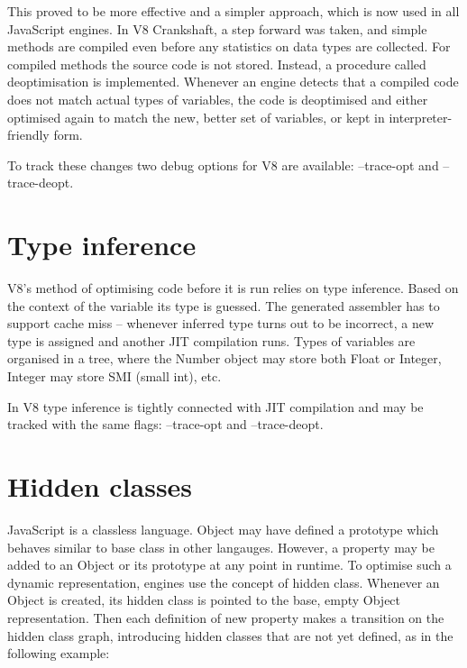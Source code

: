 This proved to be more effective and a simpler approach, which is now used in all JavaScript engines. In V8 Crankshaft, a step forward was taken, and simple methods are compiled even before any statistics on data types are collected. For compiled methods the source code is not stored. Instead, a procedure called deoptimisation is implemented. Whenever an engine detects that a compiled code does not match actual types of variables, the code is deoptimised and either optimised again to match the new, better set of variables, or kept in interpreter-friendly form.

To track these changes two debug options for V8 are available: --trace-opt and --trace-deopt.




\section{Type inference}
\label{sec:typeference}

V8's method of optimising code before it is run relies on type inference. Based on the context of the variable its type is guessed. The generated assembler has to support cache miss -- whenever inferred type turns out to be incorrect, a new type is assigned and another JIT compilation runs. Types of variables are organised in a tree, where the Number object may store both Float or Integer, Integer may store SMI (small int), etc.



In V8 type inference is tightly connected with JIT compilation and may be tracked with the same flags: --trace-opt and --trace-deopt. 

\section{Hidden classes}
\label{sec:hiddenclasses}

JavaScript is a classless language. Object may have defined a prototype which behaves similar to base class in other langauges. However, a property may be added to an Object or its prototype at any point in runtime. To optimise such a dynamic representation, engines use the concept of hidden class. Whenever an Object is created, its hidden class is pointed to the base, empty Object representation. Then each definition of new property makes a transition on the hidden class graph, introducing hidden classes that are not yet defined, as in the following example:

